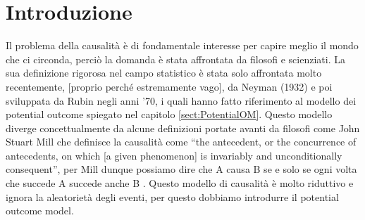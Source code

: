 \chapter{Introduzione}
\label{chapt:History Causality}
Il problema della causalità è di fondamentale interesse per capire meglio il mondo che ci circonda, perciò la domanda è stata affrontata da  filosofi e scienziati. La sua definizione rigorosa nel campo statistico è stata solo affrontata molto recentemente, [proprio perché estremamente vago], da Neyman (1932) e poi sviluppata da Rubin negli anni '70, i quali hanno fatto riferimento al modello dei potential outcome spiegato nel capitolo \ref{sect:PotentialOM}. Questo modello diverge concettualmente da alcune definizioni portate avanti da  filosofi come John Stuart Mill che definisce la causalità come “the antecedent, or the concurrence of antecedents, on which [a given phenomenon] is invariably and unconditionally consequent”, per Mill dunque possiamo dire che A causa B se e solo se ogni volta che succede A succede anche B . Questo modello di causalità è molto riduttivo e ignora la aleatorietà degli eventi, per questo dobbiamo introdurre il potential outcome model. 